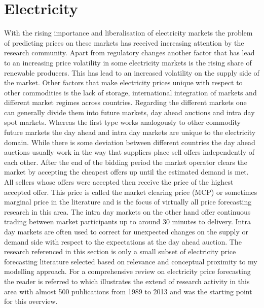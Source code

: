 \section{Electricity}
With the rising importance and liberalisation of electricity markets the problem of predicting prices on these markets has received increasing attention by the research community. Apart from regulatory changes another factor that has lead to an increasing price volatility in some electricity markets is the rising share of renewable producers. This has lead to an increased volatility on the supply side of the market. Other factors that make electricity prices unique with respect to other commodities is the lack of storage, international integration of markets and different market regimes across countries. Regarding the different markets one can generally divide them into future markets, day ahead auctions and intra day spot markets. Whereas the first type works analogously to other commodity future markets the day ahead and intra day markets are unique to the electricity domain. While there is some deviation between different countries the day ahead auctions usually work in the way that suppliers place sell offers independently of each other. After the end of the bidding period the market operator clears the market by accepting the cheapest offers up until the estimated demand is met. All sellers whose offers were accepted then receive the price of the highest accepted offer. This price is called the market clearing price (MCP) or sometimes marginal price in the literature and is the focus of virtually all price forecasting research in this area. The intra day markets on the other hand offer continuous trading between market participants up to around 30 minutes to delivery. Intra day markets are often used to correct for unexpected changes on the supply or demand side with respect to the expectations at the day ahead auction. The research referenced in this section is only a small subset of electricity price forecasting literature selected based on relevance and conceptual proximity to my modelling approach.
For a comprehensive review on electricity price forecasting the reader is referred to \textit{\cite{weron_electricity_2014}} which illustrates the extend of research activity in this area with almost 500 publications from 1989 to 2013 and was the starting point for this overview.
